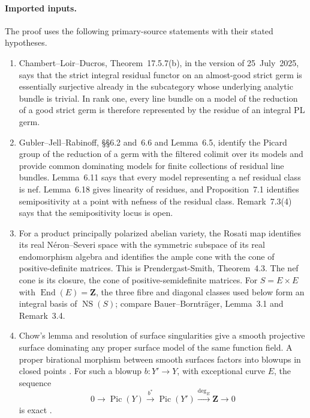 
\paragraph{Imported inputs.}
The proof uses the following primary-source statements with their stated
hypotheses.
\begin{enumerate}
\item Chambert--Loir--Ducros, Theorem~17.5.7(b), in the version of
25~July~2025, says that the strict integral residual functor on an
almost-good strict germ is essentially surjective already in the subcategory
whose underlying analytic bundle is trivial.  In rank one, every line bundle
on a model of the reduction of a good strict germ is therefore represented
by the residue of an integral PL germ.
\item Gubler--Jell--Rabinoff, \S\S6.2 and~6.6 and Lemma~6.5, identify the
Picard group of the reduction of a germ with the filtered colimit over its
models and provide common dominating models for finite collections of
residual line bundles.  Lemma~6.11 says that every model representing a nef
residual class is nef.  Lemma~6.18 gives linearity of residues, and
Proposition~7.1 identifies semipositivity at a point with nefness of the
residual class.  Remark~7.3(4) says that the semipositivity locus is open.
\item For a product principally polarized abelian variety, the Rosati map
identifies its real N\'eron--Severi space with the symmetric subspace of its
real endomorphism algebra and identifies the ample cone with the cone of
positive-definite matrices.  This is Prendergast-Smith, Theorem~4.3.  The
nef cone is its closure, the cone of positive-semidefinite matrices.
For \(S=E\times E\) with \(\operatorname{End}(E)=\mathbf Z\), the three
fibre and diagonal classes used below form an integral basis of
\(\operatorname{NS}(S)\); compare Bauer--Borntr\"ager, Lemma~3.1 and
Remark~3.4.
\item Chow's lemma \cite[Tag~02O2]{stacks-project} and resolution of
surface singularities \cite[Tag~0BGP]{stacks-project} give a smooth
projective surface dominating any proper surface model of the same function
field.  A proper birational morphism between smooth surfaces factors into
blowups in closed points \cite[Tag~0C5Q]{stacks-project}.  For such a
blowup \(b:Y'\to Y\), with exceptional curve \(E\), the sequence
\[
 0\longrightarrow\operatorname{Pic}(Y)
  \xrightarrow{b^*}\operatorname{Pic}(Y')
  \xrightarrow{\deg_E}\mathbf Z\longrightarrow0
\]
is exact \cite[Tag~0C5L]{stacks-project}.
\end{enumerate}

